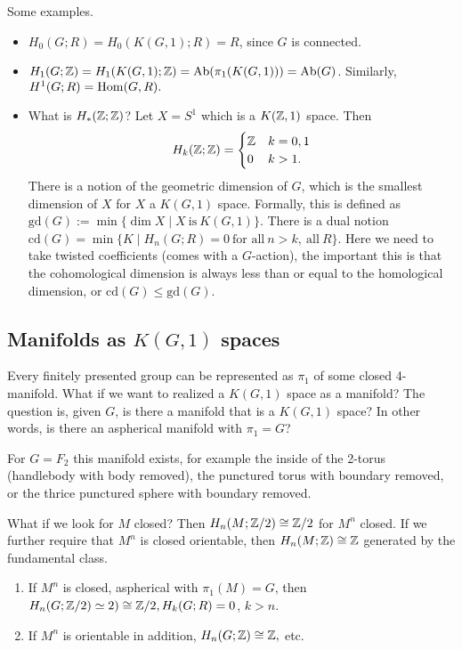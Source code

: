 \begin{example}
    Some examples.
    \begin{itemize}
    \setlength\itemsep{-.2em}
\item $H_0(G;R)=H_0(K(G,1);R)=R$, since $G$ is connected.
\item $H_1(G;\mathbb{Z})=H_1(K(G,1);\mathbb{Z})=\mathrm{Ab}(\pi_1(K(G,1)))=\mathrm{Ab}(G)$. Similarly, $H^1 (G;R)=\operatorname{Hom}(G,R).$
\item What is $H_*(\mathbb{Z};\mathbb{Z})$? Let $X=S^1 $ which is a $K(\mathbb{Z},1)$ space. Then \[
        H_k(\mathbb{Z};\mathbb{Z})=
        \begin{cases}
            \mathbb{Z} & k=0,1\\
            0 & k>1.
        \end{cases}
    \] %
    There is a notion of the geometric dimension of $G$, which is the smallest dimension of $X$ for $X$ a $K(G,1)$ space. Formally, this is defined as $\mathrm{gd}(G):=\min \{\dim X \mid  X \ \text{is} \ K(G,1)\} $. There is a dual notion $\mathrm{cd}(G)=\min \{K \mid H_n (G;R)=0 \ \text{for all} \ n>k, \ \text{all} \ R\} $. Here we need to take twisted coefficients (comes with a $G$-action), the important this is that the cohomological dimension is always less than or equal to the homological dimension, or $\mathrm{cd}(G) \leq \mathrm{gd}(G)$.
    \end{itemize}
\end{example}

\subsection{Manifolds as $K(G,1)$ spaces}
Every finitely presented group can be represented as $\pi_1$ of some closed 4-manifold. What if we want to realized a $K(G,1)$ space as a manifold? The question is, given $G$, is there a manifold that is a $K(G,1)$ space? In other words, is there an aspherical manifold with $\pi_1=G$? 
\begin{example}
    For $G=F_2$ this manifold exists, for example the inside of the 2-torus (handlebody with body removed), the punctured torus with boundary removed, or the thrice punctured sphere with boundary removed.
\end{example}
What if we look for $M$ closed? Then $H_n (M;\mathbb{Z} /2) \cong \mathbb{Z} /2  $ for $M^n $ closed. If we further require that $M^n $ is closed orientable, then $H_n (M;\mathbb{Z})\cong \mathbb{Z}$ generated by the fundamental class.

\begin{lemma}
    \begin{enumerate}[label=(\arabic*)]
    \setlength\itemsep{-.2em}
\item If $M^n $ is closed, aspherical with $\pi_1(M)=G$, then $H_n (G; \mathbb{Z} /2) \simeq 2) \cong \mathbb{Z} /2, H_k(G;R)=0$, $k>n$.
\item If $M^n $ is orientable in addition, $H_n (G;\mathbb{Z}) \cong \mathbb{Z},$ etc.
    \end{enumerate}
\end{lemma}

